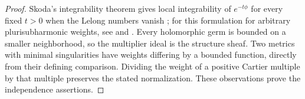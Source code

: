 \begin{proof}
Skoda's integrability theorem gives local integrability of
$e^{-t\phi}$ for every fixed $t>0$ when the Lelong numbers vanish
\cite[Proposition~7.1]{Skoda1972}; for this formulation for arbitrary
plurisubharmonic weights, see \cite[Property~1.4(8)]{DemaillyKollar2001}
and \cite[Lemma~5.6(a)]{Demailly2012}. Every holomorphic germ is bounded
on a smaller neighborhood, so the multiplier ideal is the structure
sheaf. Two metrics with minimal singularities have weights differing
by a bounded function, directly from their defining comparison.
Dividing the weight of a positive Cartier multiple by that multiple
preserves the stated normalization. These observations prove the
independence assertions.
\end{proof}
